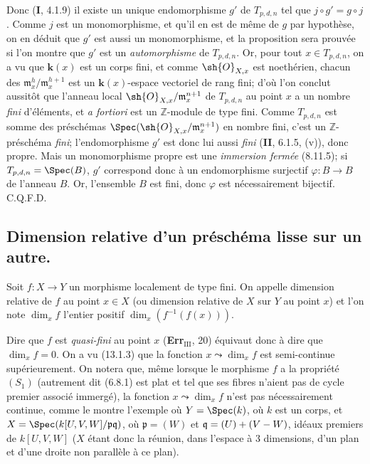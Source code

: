 Donc (\textbf{I}, 4.1.9) il existe un unique endomorphisme $g'$ de $T_{p,d,n}$ tel que $j\circ g'=g\circ j$. Comme $j$ est un monomorphisme, et qu'il en est de même de $g$ par hypothèse, on en déduit que $g'$ est aussi un monomorphisme, et la proposition sera prouvée si l'on montre que $g'$ est un \emph{automorphisme} de $T_{p,d,n}$. Or, pour tout $x\in T_{p,d,n}$, on a vu que $\boldsymbol{k}(x)$ est un corps fini, et comme $\sh{O}_{X,x}$ est noethérien, chacun des $\mathfrak m_x^h/\mathfrak m_x^{h+1}$ est un $\boldsymbol{k}(x)$-espace vectoriel de rang fini; d'où l'on conclut aussitôt que l'anneau local $\sh{O}_{X,x}/\mathfrak m_x^{n+1}$ de $T_{p,d,n}$ au point $x$ a un nombre \emph{fini} d'éléments, et \emph{a fortiori} est un $\mathbb{Z}$-module de type fini. Comme $T_{p,d,n}$ est somme des préschémas $\Spec(\sh{O}_{X,x}/\mathfrak m_x^{n+1})$ en nombre fini, c'est un $\mathbb{Z}$-préschéma \emph{fini}; l'endomorphisme $g'$ est donc lui aussi \emph{fini} (\textbf{II}, 6.1.5, (v)), donc propre. Mais un monomorphisme propre est une \emph{immersion fermée} (8.11.5); si $T_{p,d,n}=\Spec(B)$, $g'$ correspond donc à un endomorphisme surjectif $\varphi:B\to B$ de l'anneau $B$. Or, l'ensemble $B$ est fini, donc $\varphi$ est nécessairement bijectif. C.Q.F.D.

\subsection{Dimension relative d'un préschéma lisse sur un autre.}

\begin{definition}[17.10.1]
Soit $f:X\to Y$ un morphisme localement de type fini. On appelle dimension relative de $f$ au point $x\in X$ (ou dimension relative de $X$ sur $Y$ au point $x$) et l'on note $\dim_x f$ l'entier positif $\dim_x(f^{-1}(f(x)))$.
\end{definition}

Dire que $f$ est \emph{quasi-fini} au point $x$ (\textbf{Err}$_{\mathrm{III}}$, 20) équivaut donc à dire que $\dim_x f=0$. On a vu (13.1.3) que la fonction $x\leadsto\dim_x f$ est semi-continue supérieurement. On notera que, même lorsque le morphisme $f$ a la propriété $(S_1)$ (autrement dit (6.8.1) est plat et tel que ses fibres n'aient pas de cycle premier associé immergé), la fonction $x\leadsto\dim_x f$ n'est pas nécessairement continue, comme le montre l'exemple où $Y=\Spec(k)$, où $k$ est un corps, et $X=\Spec(k[U,V,W]/\mathfrak p\mathfrak q)$, où $\mathfrak p=(W)$ et $\mathfrak q=(U)+(V- W)$, idéaux premiers de $k[U,V,W]$ ($X$ étant donc la réunion, dans l'espace à 3 dimensions, d'un plan et d'une droite non parallèle à ce plan).

